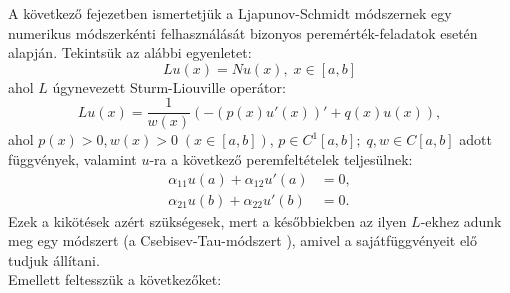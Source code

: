 \documentclass[oneside, titlepage, 12pt, a4paper]{report}
\begin{document}
A következő fejezetben ismertetjük a Ljapunov-Schmidt módszernek egy numerikus módszerkénti felhasználását bizonyos peremérték-feladatok esetén \cite{LSNum} alapján. %
Tekintsük az alábbi egyenletet:
\begin{equation}
Lu(x) = Nu(x),\;x\in[a, b] \label{eq:num:1}
\end{equation}
ahol $L$ úgynevezett Sturm-Liouville operátor:
\begin{equation*}
Lu(x) = \frac{1}{w(x)}(-(p(x)u'(x))' + q(x)u(x)),
\end{equation*}
ahol $p(x) > 0, w(x) > 0\;(x \in [a, b])$, $p \in C^1[a, b];\;q, w \in C[a, b]$ adott függvények, valamint $u$-ra a következő peremfeltételek teljesülnek:
\begin{align*}
\alpha_{11}u(a) + \alpha_{12}u'(a) &= 0, \\
\alpha_{21}u(b) + \alpha_{22}u'(b) &= 0.
\end{align*}
Ezek a kikötések azért szükségesek, mert a későbbiekben az ilyen $L$-ekhez adunk meg egy módszert (a Csebisev-Tau-módszert \cite{ChebysevTau}), amivel a sajátfüggvényeit elő tudjuk állítani. \\ %
Emellett feltesszük a következőket:
\end{document}

